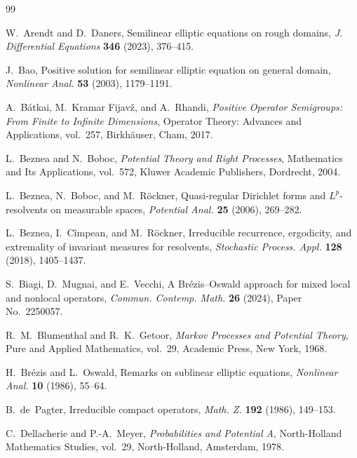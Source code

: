 \documentclass[11pt,a4paper,reqno]{amsart}
\theoremstyle{definition}
\numberwithin{equation}{section}
\begin{document}
\begin{thebibliography}{99}

W.~Arendt and D.~Daners,
\newblock Semilinear elliptic equations on rough domains,
\newblock \emph{J. Differential Equations} \textbf{346} (2023), 376--415.

J.~Bao,
\newblock Positive solution for semilinear elliptic equation on general domain,
\newblock \emph{Nonlinear Anal.} \textbf{53} (2003), 1179--1191.

A.~B\'atkai, M.~Kramar Fijav\v z, and A.~Rhandi,
\newblock \emph{Positive Operator Semigroups: From Finite to Infinite Dimensions},
\newblock Operator Theory: Advances and Applications, vol.~257,
Birkh\"auser, Cham, 2017.

L.~Beznea and N.~Boboc,
\newblock \emph{Potential Theory and Right Processes},
\newblock Mathematics and Its Applications, vol.~572,
\newblock Kluwer Academic Publishers, Dordrecht, 2004.

L.~Beznea, N.~Boboc, and M.~R\"ockner,
\newblock Quasi-regular Dirichlet forms and $L^p$-resolvents on measurable spaces,
\newblock \emph{Potential Anal.} \textbf{25} (2006), 269--282.

L.~Beznea, I.~C\^impean, and M.~R\"ockner,
\newblock Irreducible recurrence, ergodicity, and extremality of invariant measures for resolvents,
\newblock \emph{Stochastic Process. Appl.} \textbf{128} (2018), 1405--1437.

S.~Biagi, D.~Mugnai, and E.~Vecchi,
\newblock A Br\'ezis--Oswald approach for mixed local and nonlocal operators,
\newblock \emph{Commun. Contemp. Math.} \textbf{26} (2024), Paper No.~2250057.

R.~M.~Blumenthal and R.~K.~Getoor,
\newblock \emph{Markov Processes and Potential Theory},
\newblock Pure and Applied Mathematics, vol.~29,
Academic Press, New York, 1968.

H.~Br\'ezis and L.~Oswald,
\newblock Remarks on sublinear elliptic equations,
\newblock \emph{Nonlinear Anal.} \textbf{10} (1986), 55--64.

B.~de~Pagter,
\newblock Irreducible compact operators,
\newblock \emph{Math. Z.} \textbf{192} (1986), 149--153.

C.~Dellacherie and P.-A.~Meyer,
\newblock \emph{Probabilities and Potential A},
\newblock North-Holland Mathematics Studies, vol.~29,
North-Holland, Amsterdam, 1978.


\end{thebibliography}
\end{document}
